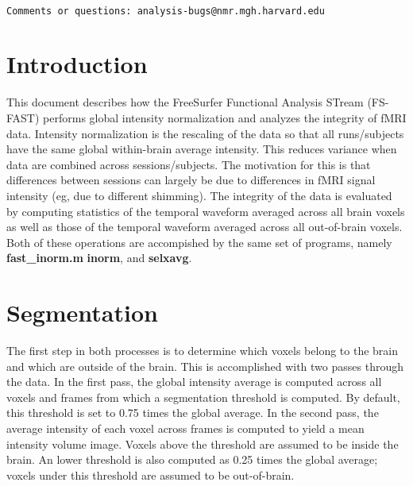 \documentclass[10pt]{article}
\begin{document}
\begin{center}
\begin{Large}
 \\
\end{Large}
\end{center}

\noindent 
\begin{verbatim}
Comments or questions: analysis-bugs@nmr.mgh.harvard.edu
\end{verbatim}

\section{Introduction}
This document describes how the FreeSurfer Functional Analysis STream
(FS-FAST) performs global intensity normalization and analyzes the
integrity of fMRI data. Intensity normalization is the rescaling of
the data so that all runs/subjects have the same global within-brain
average intensity.  This reduces variance when data are combined
across sessions/subjects.  The motivation for this is that differences
between sessions can largely be due to differences in fMRI signal
intensity (eg, due to different shimming). The integrity of the data
is evaluated by computing statistics of the temporal waveform averaged
across all brain voxels as well as those of the temporal waveform averaged
across all out-of-brain voxels.  Both of these operations are
accompished by the same set of programs, namely {\bf fast\_inorm.m}
{\bf inorm}, and {\bf selxavg}.

\section{Segmentation}

The first step in both processes is to determine which voxels belong
to the brain and which are outside of the brain.  This is accomplished
with two passes through the data. In the first pass, the global
intensity average is computed across all voxels and frames from which
a segmentation threshold is computed. By default, this threshold is
set to 0.75 times the global average.  In the second pass, the average
intensity of each voxel across frames is computed to yield a mean
intensity volume image. Voxels above the threshold are assumed to be
inside the brain.  An lower threshold is also computed as 0.25
times the global average;  voxels under this threshold are assumed to be
out-of-brain.
\end{document}
